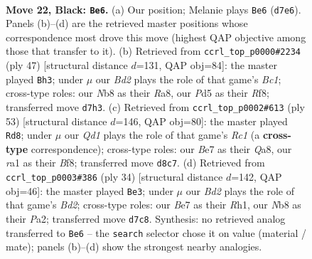 \documentclass[11pt]{article}
\begin{document}
\clearpage

\begin{figure}[p]\centering
\begin{subfigure}{0.46\textwidth}\centering
\resizebox{\linewidth}{!}{%
\newchessgame
\chessboard[
  setfen={rn1qk3/p2bbr2/1p4Q1/3pN1P1/P7/2NB4/1P3P2/R1B1K2R b KQ - 0 22},
  showmover=false,
  pgfstyle=straightmove, color=movearrow, markmove={d7-e6}
]}
\caption{}
\end{subfigure}\hfill
\begin{subfigure}{0.46\textwidth}\centering
\resizebox{\linewidth}{!}{%
\newchessgame
\chessboard[
  setfen={r1bq1r1k/pp4p1/3b3p/3Q4/3PB3/P3PN2/1P5P/2RR2K1 b - - 2 24},
  showmover=false,
  pgfstyle=straightmove, color=movearrow, markmove={c8-h3}
]}
\caption{}
\end{subfigure}
\\[4pt]
\begin{subfigure}{0.46\textwidth}\centering
\resizebox{\linewidth}{!}{%
\newchessgame
\chessboard[
  setfen={q1r2bk1/5ppp/p1b1rn2/2R5/1P1N1p2/P6P/1N4PB/R2Q1BK1 b - - 0 27},
  showmover=false,
  pgfstyle=straightmove, color=movearrow, markmove={c8-d8}
]}
\caption{}
\end{subfigure}\hfill
\begin{subfigure}{0.46\textwidth}\centering
\resizebox{\linewidth}{!}{%
\newchessgame
\chessboard[
  setfen={2kr1b1r/p4ppp/q7/1Np5/1P2n3/8/P2BQP1P/R3K2R w KQ - 0 18},
  showmover=false,
  pgfstyle=straightmove, color=movearrow, markmove={d2-e3}
]}
\caption{}
\end{subfigure}
\caption{\textbf{Move 22, Black: \texttt{Be6}.} (a) Our position; Melanie plays \texttt{Be6} (\texttt{d7e6}). Panels (b)--(d) are the retrieved master positions whose correspondence most drove this move (highest QAP objective among those that transfer to it). (b) Retrieved from \texttt{ccrl\_top\_p0000\#2234} (ply 47) [structural distance $d$=131, QAP obj=84]: the master played \texttt{Bh3}; under $\mu$ our \emph{Bd2} plays the role of that game's \emph{Bc1}; cross-type roles: our \emph{N}b8 as their \emph{R}a8, our \emph{P}d5 as their \emph{R}f8; transferred move \texttt{d7h3}. (c) Retrieved from \texttt{ccrl\_top\_p0002\#613} (ply 53) [structural distance $d$=146, QAP obj=80]: the master played \texttt{Rd8}; under $\mu$ our \emph{Qd1} plays the role of that game's \emph{Rc1} (a \textbf{cross-type} correspondence); cross-type roles: our \emph{B}e7 as their \emph{Q}a8, our \emph{r}a1 as their \emph{B}f8; transferred move \texttt{d8c7}. (d) Retrieved from \texttt{ccrl\_top\_p0003\#386} (ply 34) [structural distance $d$=142, QAP obj=46]: the master played \texttt{Be3}; under $\mu$ our \emph{Bd2} plays the role of that game's \emph{Bd2}; cross-type roles: our \emph{B}e7 as their \emph{R}h1, our \emph{N}b8 as their \emph{P}a2; transferred move \texttt{d7c8}. Synthesis: no retrieved analog transferred to \texttt{Be6} -- the \texttt{search} selector chose it on value (material / mate); panels (b)--(d) show the strongest nearby analogies.}
\label{fig:thought-m43}
\end{figure}
\end{document}
